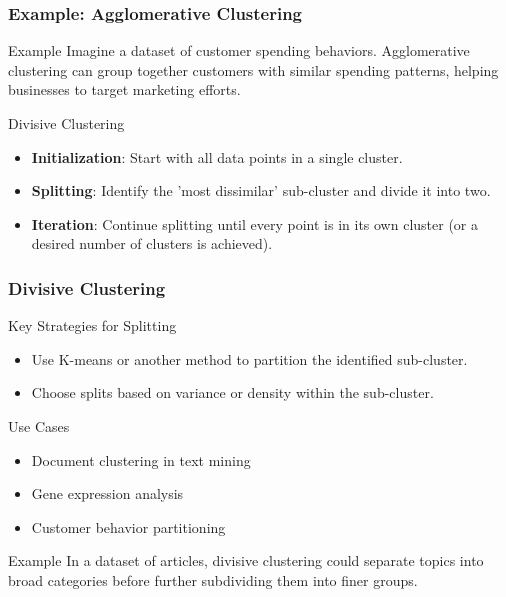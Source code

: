 \documentclass[aspectratio=169]{beamer}
\begin{document}
\begin{frame}[fragile]
    \frametitle{Example: Agglomerative Clustering}
    \begin{block}{Example}
        Imagine a dataset of customer spending behaviors. Agglomerative clustering can group together customers with similar spending patterns, helping businesses to target marketing efforts.
    \end{block}

    \begin{block}{Divisive Clustering}
        \begin{itemize}
            \item \textbf{Initialization}: Start with all data points in a single cluster.
            \item \textbf{Splitting}: Identify the 'most dissimilar' sub-cluster and divide it into two.
            \item \textbf{Iteration}: Continue splitting until every point is in its own cluster (or a desired number of clusters is achieved).
        \end{itemize}
    \end{block}
\end{frame}

\begin{frame}[fragile]
    \frametitle{Divisive Clustering}
    \begin{block}{Key Strategies for Splitting}
        \begin{itemize}
            \item Use K-means or another method to partition the identified sub-cluster.
            \item Choose splits based on variance or density within the sub-cluster.
        \end{itemize}
    \end{block}

    \begin{block}{Use Cases}
        \begin{itemize}
            \item Document clustering in text mining
            \item Gene expression analysis
            \item Customer behavior partitioning
        \end{itemize}
    \end{block}

    \begin{block}{Example}
        In a dataset of articles, divisive clustering could separate topics into broad categories before further subdividing them into finer groups.
    \end{block}
\end{frame}
\end{document}
